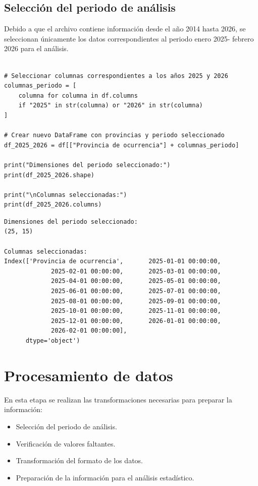 \documentclass[11pt]{article}
\begin{document}
\subsection{Selección del periodo de análisis}
\label{sec:org2f6bbba}

Debido a que el archivo contiene información desde el año 2014 hasta
2026, se seleccionan únicamente los datos correspondientes al periodo
enero 2025- febrero 2026 para el análisis.

\begin{verbatim}

# Seleccionar columnas correspondientes a los años 2025 y 2026
columnas_periodo = [
    columna for columna in df.columns
    if "2025" in str(columna) or "2026" in str(columna)
]

# Crear nuevo DataFrame con provincias y periodo seleccionado
df_2025_2026 = df[["Provincia de ocurrencia"] + columnas_periodo]

print("Dimensiones del periodo seleccionado:")
print(df_2025_2026.shape)

print("\nColumnas seleccionadas:")
print(df_2025_2026.columns)

\end{verbatim}

\begin{verbatim}
Dimensiones del periodo seleccionado:
(25, 15)

Columnas seleccionadas:
Index(['Provincia de ocurrencia',       2025-01-01 00:00:00,
             2025-02-01 00:00:00,       2025-03-01 00:00:00,
             2025-04-01 00:00:00,       2025-05-01 00:00:00,
             2025-06-01 00:00:00,       2025-07-01 00:00:00,
             2025-08-01 00:00:00,       2025-09-01 00:00:00,
             2025-10-01 00:00:00,       2025-11-01 00:00:00,
             2025-12-01 00:00:00,       2026-01-01 00:00:00,
             2026-02-01 00:00:00],
      dtype='object')
\end{verbatim}



\section{Procesamiento de datos}
\label{sec:org489b36a}

En esta etapa se realizan las transformaciones necesarias para preparar
la información:

\begin{itemize}
\item Selección del periodo de análisis.
\item Verificación de valores faltantes.
\item Transformación del formato de los datos.
\item Preparación de la información para el análisis estadístico.
\end{itemize}
\end{document}
